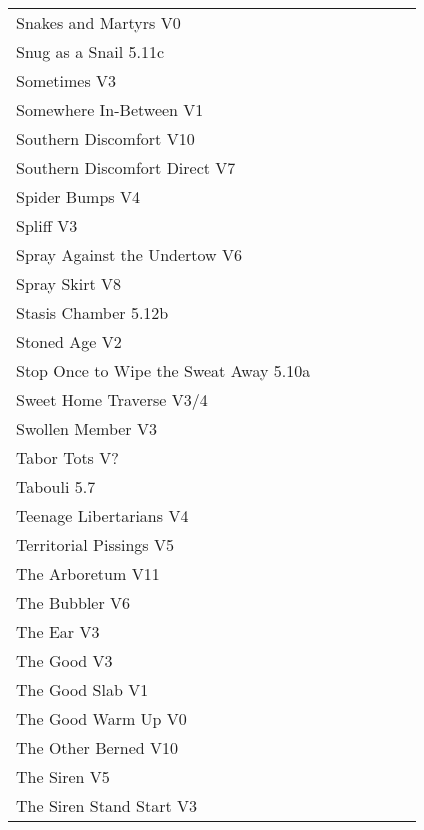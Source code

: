 \begin{flushleft}
\begin{center}
\begin{supertabular}{p{0.76\linewidth}p{0.08\linewidth}}
Snakes and Martyrs V0 & \pageref{rt:Snakes and Martyrs} \\
Snug as a Snail 5.11c & \pageref{rt:Snug as a Snail} \\
Sometimes V3 & \pageref{rt:Sometimes} \\
Somewhere In-Between V1 & \pageref{rt:Somewhere In-Between} \\
Southern Discomfort V10 & \pageref{rt:Southern Discomfort} \\
Southern Discomfort Direct V7 & \pageref{vr:Southern Discomfort Direct} \\
Spider Bumps V4 & \pageref{rt:Spider Bumps} \\
Spliff V3 & \pageref{rt:Spliff} \\
Spray Against the Undertow V6 & \pageref{vr:Spray Against the Undertow} \\
Spray Skirt V8 & \pageref{rt:Spray Skirt} \\
Stasis Chamber 5.12b & \pageref{rt:Stasis Chamber} \\
Stoned Age V2 & \pageref{rt:Stoned Age} \\
Stop Once to Wipe the Sweat Away 5.10a & \pageref{rt:Stop Once to Wipe the Sweat Away} \\
Sweet Home Traverse V3/4 & \pageref{vr:Sweet Home Traverse} \\
Swollen Member V3 & \pageref{rt:Swollen Member} \\
Tabor Tots V? & \pageref{vr:Tabor Tots} \\
Tabouli 5.7 & \pageref{rt:Tabouli} \\
Teenage Libertarians V4 & \pageref{rt:Teenage Libertarians} \\
Territorial Pissings V5 & \pageref{rt:Territorial Pissings} \\
The Arboretum V11 & \pageref{rt:The Arboretum} \\
The Bubbler V6 & \pageref{rt:The Bubbler} \\
The Ear V3 & \pageref{rt:The Ear} \\
The Good V3 & \pageref{rt:The Good} \\
The Good Slab V1 & \pageref{rt:The Good Slab} \\
The Good Warm Up V0 & \pageref{rt:The Good Warm Up} \\
The Other Berned V10 & \pageref{rt:The Other Berned} \\
The Siren V5 & \pageref{rt:The Siren} \\
The Siren Stand Start V3 & \pageref{vr:The Siren Stand Start} \\

\end{supertabular}
\end{center}
\end{flushleft}
